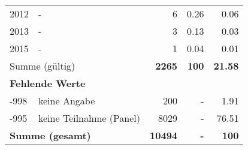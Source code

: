 \begin{longtable}{lXrrr}
     2012 &
     \multicolumn{1}{X}{ -  } &


       \num{6} &
       \num[round-mode=places,round-precision=2]{0.26} &
         \num[round-mode=places,round-precision=2]{0.06} \\

     2013 &
     \multicolumn{1}{X}{ -  } &


       \num{3} &
       \num[round-mode=places,round-precision=2]{0.13} &
         \num[round-mode=places,round-precision=2]{0.03} \\

     2015 &
     \multicolumn{1}{X}{ -  } &


       \num{1} &
       \num[round-mode=places,round-precision=2]{0.04} &
         \num[round-mode=places,round-precision=2]{0.01} \\
     \midrule
     \multicolumn{2}{l}{Summe (gültig)} &
       \textbf{\num{2265}} &
     \textbf{\num{100}} &
       \textbf{\num[round-mode=places,round-precision=2]{21.58}} \\
     \multicolumn{5}{l}{\textbf{Fehlende Werte}}\\
       -998 &
       keine Angabe &
         \num{200} &
        - &
         \num[round-mode=places,round-precision=2]{1.91} \\
       -995 &
       keine Teilnahme (Panel) &
         \num{8029} &
        - &
         \num[round-mode=places,round-precision=2]{76.51} \\
     \midrule
     \multicolumn{2}{l}{\textbf{Summe (gesamt)}} &
          \textbf{\num{10494}} &
        \textbf{-} &
        \textbf{\num{100}} \\
     \bottomrule
     \end{longtable}
     
